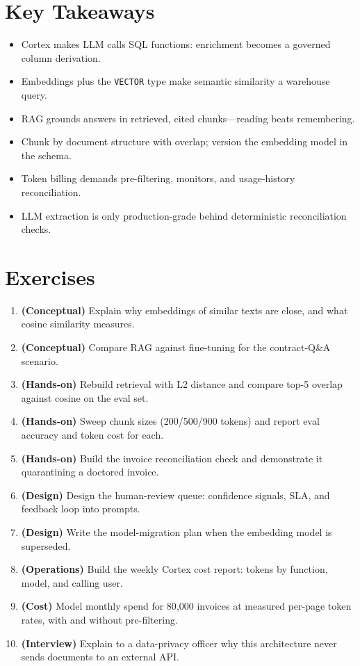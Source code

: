 \section*{Key Takeaways}
\begin{itemize}
    \item Cortex makes LLM calls SQL functions: enrichment becomes a governed column derivation.
    \item Embeddings plus the \texttt{VECTOR} type make semantic similarity a warehouse query.
    \item RAG grounds answers in retrieved, cited chunks---reading beats remembering.
    \item Chunk by document structure with overlap; version the embedding model in the schema.
    \item Token billing demands pre-filtering, monitors, and usage-history reconciliation.
    \item LLM extraction is only production-grade behind deterministic reconciliation checks.
\end{itemize}

\section{Exercises}
\begin{enumerate}
    \item \textbf{(Conceptual)} Explain why embeddings of similar texts are close, and what cosine similarity measures.
    \item \textbf{(Conceptual)} Compare RAG against fine-tuning for the contract-Q\&A scenario.
    \item \textbf{(Hands-on)} Rebuild retrieval with L2 distance and compare top-5 overlap against cosine on the eval set.
    \item \textbf{(Hands-on)} Sweep chunk sizes (200/500/900 tokens) and report eval accuracy and token cost for each.
    \item \textbf{(Hands-on)} Build the invoice reconciliation check and demonstrate it quarantining a doctored invoice.
    \item \textbf{(Design)} Design the human-review queue: confidence signals, SLA, and feedback loop into prompts.
    \item \textbf{(Design)} Write the model-migration plan when the embedding model is superseded.
    \item \textbf{(Operations)} Build the weekly Cortex cost report: tokens by function, model, and calling user.
    \item \textbf{(Cost)} Model monthly spend for 80{,}000 invoices at measured per-page token rates, with and without pre-filtering.
    \item \textbf{(Interview)} Explain to a data-privacy officer why this architecture never sends documents to an external API.
\end{enumerate}
